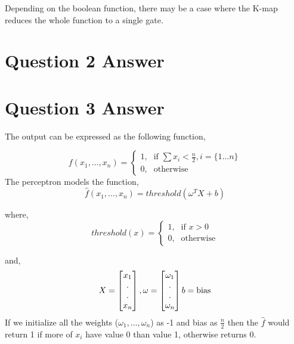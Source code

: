 \documentclass{article}
\begin{document}
Depending on the boolean function, there may be a case where the K-map reduces the whole function to a single gate.

\section*{Question 2 Answer}

\section*{Question 3 Answer}

The output can be expressed as the following function,

\begin{displaymath}
    f(x_1,\dots,x_n) = 
    \begin{cases} 
        \mbox{1,} & \mbox{if } \sum x_i < \frac{n}{2}, i = \{1\dots n\} \\ 
        \mbox{0,} & \mbox{otherwise} 
    \end{cases} 
\end{displaymath}
%
The perceptron models the function,
\begin{displaymath}
    \hat{f}(x_1,\dots,x_n) = threshold(\omega^T X + b)
\end{displaymath}

where,
\begin{displaymath}
    threshold(x) = 
    \begin{cases}
        \mbox{1,} & \mbox{if } x > 0 \\
        \mbox{0,} & \mbox{otherwise}
    \end{cases}
\end{displaymath}

and,
\begin{displaymath}
    X = \begin{bmatrix}x_1\\ . \\ . \\x_n\end{bmatrix},\\
    \omega = \begin{bmatrix}\omega_1\\ . \\ . \\\omega_n\end{bmatrix} \\
    b = \mbox{bias}
\end{displaymath}
%
If we initialize all the weights ($\omega_1,\dots,\omega_n$) as -1 and bias as $\frac{n}{2}$ then the $\hat{f}$ would return 1 if more of  $x_i$ have value 0 than value 1, otherwise returns 0.
\end{document}

